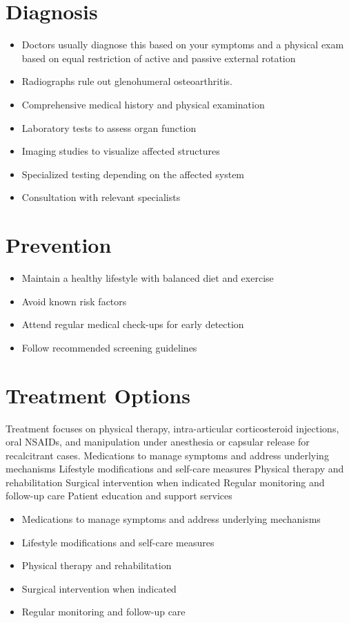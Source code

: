 \section{Diagnosis}
\begin{itemize}[noitemsep]
  \item Doctors usually diagnose this based on your symptoms and a physical exam based on equal restriction of active and passive external rotation
  \item Radiographs rule out glenohumeral osteoarthritis.
  \item Comprehensive medical history and physical examination
  \item Laboratory tests to assess organ function
  \item Imaging studies to visualize affected structures
  \item Specialized testing depending on the affected system
  \item Consultation with relevant specialists
\end{itemize}
\section{Prevention}
\begin{itemize}[noitemsep]
  \item Maintain a healthy lifestyle with balanced diet and exercise
  \item Avoid known risk factors
  \item Attend regular medical check-ups for early detection
  \item Follow recommended screening guidelines
\end{itemize}
\section{Treatment Options}
Treatment focuses on physical therapy, intra-articular corticosteroid injections, oral NSAIDs, and manipulation under anesthesia or capsular release for recalcitrant cases. Medications to manage symptoms and address underlying mechanisms Lifestyle modifications and self-care measures Physical therapy and rehabilitation Surgical intervention when indicated Regular monitoring and follow-up care Patient education and support services

\begin{itemize}[noitemsep]
  \item Medications to manage symptoms and address underlying mechanisms
  \item Lifestyle modifications and self-care measures
  \item Physical therapy and rehabilitation
  \item Surgical intervention when indicated
  \item Regular monitoring and follow-up care
\end{itemize}
